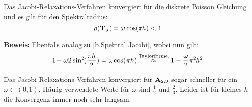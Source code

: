 Das Jacobi-Relaxations-Verfahren konvergiert für die diskrete Poisson Gleichung und es gilt für den Spektralradius:
\begin{equation}
\rho({\textbf{T}}_{J}) = \omega \cos(\pi h) < 1
\end{equation}

\textbf{Beweis:}\label{b.Beweis Spektralradius}
Ebenfalls analog zu \autoref{b.Spektral Jacobi}, wobei nun gilt:
\begin{equation}
1 - \omega 2\sin^{2} (\frac {\pi h} {2}) = \omega \cos (\pi h) \overset{\textnormal{Taylorformel}}{\approx} 1 - \frac {\omega} {2} \pi^{2} h^{2}
\end{equation}

Das Jacobi-Relaxations-Verfahren konvergiert für ${\textbf{A}}_{2D}$ sogar schneller für ein $\omega \in (0,1)$. Häufig verwendete Werte für $\omega$ sind $\frac {1} {2}$ und $\frac {2} {3}$. Leider ist für kleines $h$ die Konvergenz immer noch sehr langsam.







